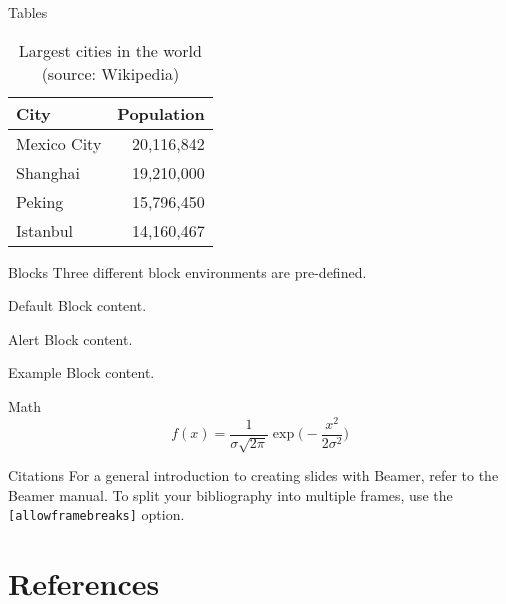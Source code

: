 \documentclass[aspectratio=169]{beamer}
\begin{document}
\begin{frame}{Tables}
  \begin{table}
    \caption{Largest cities in the world (source: Wikipedia)}
    \begin{tabular}{@{} lr @{}}
      \toprule
      City & Population\\
      \midrule
      Mexico City & 20,116,842\\
      Shanghai & 19,210,000\\
      Peking & 15,796,450\\
      Istanbul & 14,160,467\\
      \bottomrule
    \end{tabular}
  \end{table}
\end{frame}

\begin{frame}{Blocks}
  	Three different block environments are pre-defined.
    \begin{block}{Default}
        Block content.
    \end{block}

      \begin{alertblock}{Alert}
        Block content.
      \end{alertblock}

      \begin{exampleblock}{Example}
        Block content.
      \end{exampleblock}
\end{frame}

\begin{frame}{Math}
  \begin{equation*}
  f(x) =   \frac{1}{\sigma\sqrt{2\pi}}\exp\biggl(-\frac{x^2}{2\sigma^2}\biggr)
  \end{equation*}
\end{frame}

\begin{frame}[fragile]{Citations}
For a general introduction to creating slides with Beamer, refer to the Beamer manual.\cite{BeamerManual}
To split your bibliography into multiple frames, use the \verb+[allowframebreaks]+ option.
\end{frame}

\makethanks

\section{References}
\begin{frame}[allowframebreaks]
  \small
    
	
\end{frame}
\end{document}
